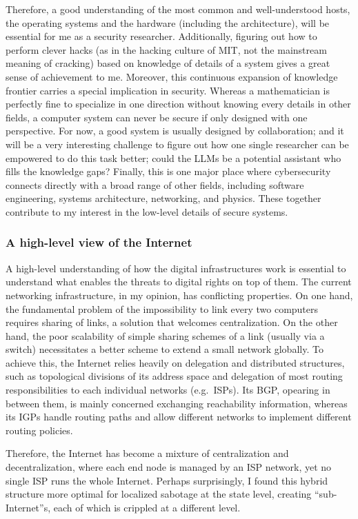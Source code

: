 \documentclass[10pt]{article}
\begin{document}
Therefore, a good understanding of the most common and well-understood hosts,
the operating systems and the hardware (including the architecture), will be
essential for me as a security researcher. Additionally, figuring out how to
perform clever hacks (as in the hacking culture of MIT, not the mainstream
meaning of cracking) based on knowledge of details of a system gives a great
sense of achievement to me. Moreover, this continuous expansion of knowledge
frontier carries a special implication in security. Whereas a mathematician is
perfectly fine to specialize in one direction without knowing every details in
other fields, a computer system can never be secure if only designed with one
perspective. For now, a good system is usually designed by collaboration; and
it will be a very interesting challenge to figure out how one single researcher
can be empowered to do this task better; could the LLMs be a potential
assistant who fills the knowledge gaps? Finally, this is one major place where
cybersecurity connects directly with a broad range of other fields, including
software engineering, systems architecture, networking, and physics.  These
together contribute to my interest in the low-level details of secure systems.

\subsubsection{A high-level view of the Internet} \label{sec.high.level}
A high-level understanding of how the digital infrastructures work is essential
to understand what enables the threats to digital rights on top of them. The
current networking infrastructure, in my opinion, has conflicting properties.
On one hand, the fundamental problem of the impossibility to link every two
computers requires sharing of links, a solution that welcomes centralization.
On the other hand, the poor scalability of simple sharing schemes of a link
(usually via a switch) necessitates a better scheme to extend a small network
globally. To achieve this, the Internet relies heavily on delegation and
distributed structures, such as topological divisions of its address space and
delegation of most routing responsibilities to each individual networks (e.g.\
ISPs). Its BGP, opearing in between them, is mainly concerned exchanging
reachability information, whereas its IGPs handle routing paths and allow
different networks to implement different routing policies.

Therefore, the Internet has become a mixture of centralization and
decentralization, where each end node is managed by an ISP network, yet no
single ISP runs the whole Internet. Perhaps surprisingly, I found this hybrid
structure more optimal for localized sabotage at the state level, creating
``sub-Internet''s, each of which is crippled at a different level. 
\end{document}
